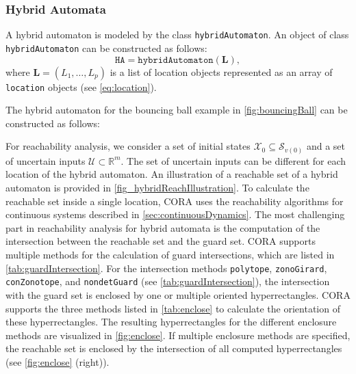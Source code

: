 \subsubsection{Hybrid Automata} \label{sec:hybridAutomaton}

A hybrid automaton is modeled by the class \texttt{hybridAutomaton}. An object of class \texttt{hybridAutomaton} can be constructed as follows:
\begin{equation*}
    \texttt{HA} = \texttt{hybridAutomaton}(\mathbf{L}),
\end{equation*}
where $\mathbf{L} = (L_1,\dots,L_p)$ is a list of location objects represented as an array of \texttt{location} objects (see \eqref{eq:location}).

The hybrid automaton for the bouncing ball example in \cref{fig:bouncingBall} can be constructed as follows:

\begin{center}
    \begin{minipage}[t]{0.1\textwidth}
        \vspace{10pt}
    \end{minipage}
    \begin{minipage}[t]{0.8\textwidth}
        \footnotesize
        
    \end{minipage}
\end{center}

\vspace{1cm}

\label{sec:hybridAutomatonReach}

For reachability analysis, we consider a set of initial states $\mathcal{X}_0 \subseteq \mathcal{S}_{v(0)}$ and a set of uncertain inputs $\mathcal{U} \subset \mathbb{R}^m$. The set of uncertain inputs can be different for each location of the hybrid automaton. An illustration of a reachable set of a hybrid automaton is provided in \cref{fig_hybridReachIllustration}. To calculate the reachable set inside a single location, CORA uses the reachability algorithms for continuous systems described in \cref{sec:continuousDynamics}. The most challenging part in reachability analysis for hybrid automata is the computation of the intersection between the reachable set and the guard set. CORA supports multiple methods for the calculation of guard intersections, which are listed in \cref{tab:guardIntersection}. For the intersection methods \texttt{polytope}, \texttt{zonoGirard}, \texttt{conZonotope}, and \texttt{nondetGuard} (see \cref{tab:guardIntersection}), the intersection with the guard set is enclosed by one or multiple oriented hyperrectangles. CORA supports the three methods listed in \cref{tab:enclose} to calculate the orientation of these hyperrectangles. The resulting hyperrectangles for the different enclosure methods are visualized in \cref{fig:enclose}. If multiple enclosure methods are specified, the reachable set is enclosed by the intersection of all computed hyperrectangles (see \cref{fig:enclose} (right)).


